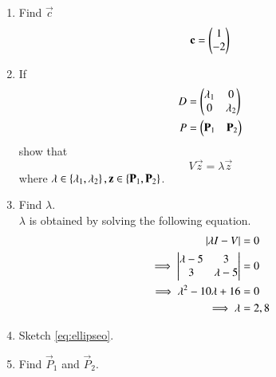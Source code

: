 \documentclass[journal,12pt,twocolumn]{IEEEtran}
\renewcommand\thesection{\arabic{section}}
\begin{document}
\begin{enumerate}[label=\thesection.\arabic*
,ref=\thesection.\theenumi]
\begin{align}
\label{eq:ellipse_parmas_c}
\end{align}
for 
\begin{equation}
\vec{P}^\vec{T}\vec{P} = \vec{I}
\label{eq:ellipse_trans}
\end{equation}
\item Find $\vec{c}$
\\
\solution 
\begin{align}
\mathbf{c} = \begin{pmatrix}1 \\ -2\end{pmatrix}
\end{align}
\item If 
\begin{align}
D &= \begin{pmatrix}\lambda_1 & 0 \\ 0 & \lambda_2 \end{pmatrix}
\\
P &= \begin{pmatrix}\mathbf{P}_1 & \mathbf{P}_2 \end{pmatrix}
\label{eq:ellipse_eigmat}
\end{align}
show that 
\begin{equation}
V\vec{z} = \lambda \vec{z}
\label{eq:ellipse_eig}
\end{equation}
%
where $\lambda \in \left\{\lambda_1, \lambda_2\right\}, \mathbf{z}\in\left\{ \mathbf{P}_1, \mathbf{P}_2\right\}$.
\item Find $\lambda$.
\\
\solution $\lambda$ is obtained by solving the following equation.
\begin{align}
\left\vert\lambda I-V\right\vert &= 0
\label{eq:ellipse_ceq}
\\
\implies\begin{vmatrix}\lambda -5 & 3 \\ 3 & \lambda -5\end{vmatrix} & = 0
\\
\implies \lambda^2 -10 \lambda+ 16 &= 0
\\
\implies \lambda &= 2, 8
\end{align}
\item Sketch \ref{eq:ellipseo}.
\item Find $\vec{P}_1$ and $\vec{P}_2$.

\end{enumerate}
\end{document}
